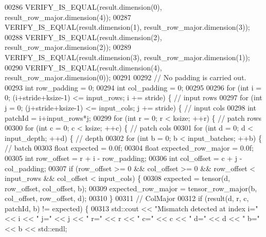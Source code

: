 \begin{DoxyCode}
00286   VERIFY\_IS\_EQUAL(result.dimension(0), result\_row\_major.dimension(4));
00287   VERIFY\_IS\_EQUAL(result.dimension(1), result\_row\_major.dimension(3));
00288   VERIFY\_IS\_EQUAL(result.dimension(2), result\_row\_major.dimension(2));
00289   VERIFY\_IS\_EQUAL(result.dimension(3), result\_row\_major.dimension(1));
00290   VERIFY\_IS\_EQUAL(result.dimension(4), result\_row\_major.dimension(0));
00291 
00292   \textcolor{comment}{// No padding is carried out.}
00293   \textcolor{keywordtype}{int} row\_padding = 0;
00294   \textcolor{keywordtype}{int} col\_padding = 0;
00295 
00296   \textcolor{keywordflow}{for} (\textcolor{keywordtype}{int} i = 0; (i+stride+ksize-1) <= input\_rows; i += stride) \{  \textcolor{comment}{// input rows}
00297     \textcolor{keywordflow}{for} (\textcolor{keywordtype}{int} j = 0; (j+stride+ksize-1) <= input\_cols; j += stride) \{  \textcolor{comment}{// input cols}
00298       \textcolor{keywordtype}{int} patchId = i+input\_rows*j;
00299       \textcolor{keywordflow}{for} (\textcolor{keywordtype}{int} r = 0; r < ksize; ++r) \{  \textcolor{comment}{// patch rows}
00300         \textcolor{keywordflow}{for} (\textcolor{keywordtype}{int} c = 0; c < ksize; ++c) \{  \textcolor{comment}{// patch cols}
00301           \textcolor{keywordflow}{for} (\textcolor{keywordtype}{int} d = 0; d < input\_depth; ++d) \{  \textcolor{comment}{// depth}
00302             \textcolor{keywordflow}{for} (\textcolor{keywordtype}{int} b = 0; b < input\_batches; ++b) \{  \textcolor{comment}{// batch}
00303               \textcolor{keywordtype}{float} expected = 0.0f;
00304               \textcolor{keywordtype}{float} expected\_row\_major = 0.0f;
00305               \textcolor{keywordtype}{int} row\_offset = r + i - row\_padding;
00306               \textcolor{keywordtype}{int} col\_offset = c + j - col\_padding;
00307               \textcolor{keywordflow}{if} (row\_offset >= 0 && col\_offset >= 0 && row\_offset < input\_rows && col\_offset < input\_cols)
       \{
00308                 expected = tensor(d, row\_offset, col\_offset, b);
00309                 expected\_row\_major = tensor\_row\_major(b, col\_offset, row\_offset, d);
00310               \}
00311               \textcolor{comment}{// ColMajor}
00312               \textcolor{keywordflow}{if} (result(d, r, c, patchId, b) != expected) \{
00313                 std::cout << \textcolor{stringliteral}{"Mismatch detected at index i="} << i << \textcolor{stringliteral}{" j="} << j << \textcolor{stringliteral}{" r="} << r << \textcolor{stringliteral}{" c="} << c
       << \textcolor{stringliteral}{" d="} << d << \textcolor{stringliteral}{" b="} << b << std::endl;

\end{DoxyCode}
